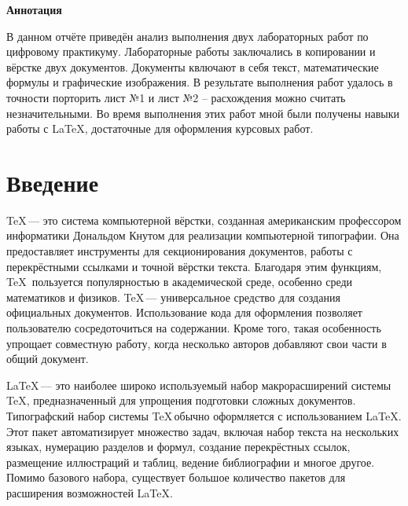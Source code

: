 \documentclass[a4paper, final]{article}
\begin{document}
{
\begin{center}
    {\large\bf Аннотация}
\end{center}

В данном отчёте приведён анализ выполнения двух  
лабораторных работ по цифровому практикуму. Лабораторные работы заключались  
в копировании и вёрстке двух документов. Документы квлючают в себя текст, математические формулы и графические изображения. В результате выполнения работ удалось в точности порторить лист №1 и лист №2 -- расхождения можно считать незначительными. Во время выполнения этих работ мной были получены навыки  
работы с \LaTeX{}, достаточные для оформления курсовых работ.  

\newpage
}




\tableofcontents
\newpage
    
    


{
\section*{Введение}

\TeX \,— это система компьютерной вёрстки, созданная американским профессором информатики Дональдом Кнутом для реализации компьютерной типографии. Она предоставляет инструменты для секционирования документов, работы с перекрёстными ссылками и точной вёрстки текста. Благодаря этим функциям, \TeX \, пользуется популярностью в академической среде, особенно среди математиков и физиков.
\TeX \,— универсальное средство для создания официальных документов. Использование кода для оформления позволяет пользователю сосредоточиться на содержании. Кроме того, такая особенность упрощает совместную работу, когда несколько авторов добавляют свои части в общий документ.

\LaTeX \,— это наиболее широко используемый набор макрорасширений системы \TeX, предназначенный для упрощения подготовки сложных документов. Типографский набор системы \TeX \,обычно оформляется с использованием \LaTeX. Этот пакет автоматизирует множество задач, включая набор текста на нескольких языках, нумерацию разделов и формул, создание перекрёстных ссылок, размещение иллюстраций и таблиц, ведение библиографии и многое другое. Помимо базового набора, существует большое количество пакетов для расширения возможностей \LaTeX.\cite{wayne-uni:What are LaTeX Packages?}

\newpage
}
\end{document}
